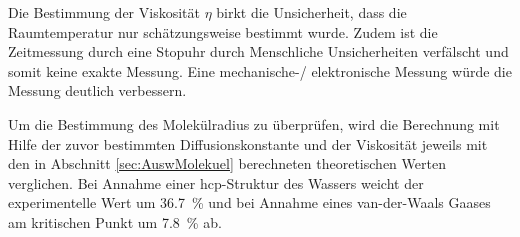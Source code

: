 Die Bestimmung der Viskosität $\eta$ birkt die Unsicherheit, dass die Raumtemperatur
nur schätzungsweise bestimmt wurde. Zudem ist die Zeitmessung durch eine Stopuhr durch
Menschliche Unsicherheiten verfälscht und somit keine exakte Messung. Eine mechanische-/
elektronische Messung würde die Messung deutlich verbessern.

Um die Bestimmung des Molekülradius zu überprüfen, wird die Berechnung mit Hilfe der zuvor
bestimmten Diffusionskonstante und der Viskosität jeweils mit den
in Abschnitt \ref{sec:AuswMolekuel} berechneten theoretischen Werten verglichen.
Bei Annahme einer hcp-Struktur des Wassers weicht der experimentelle Wert
um \SI{36.7}{\percent} und bei Annahme eines
van-der-Waals Gaases am kritischen Punkt um \SI{7.8}{\percent} ab.
